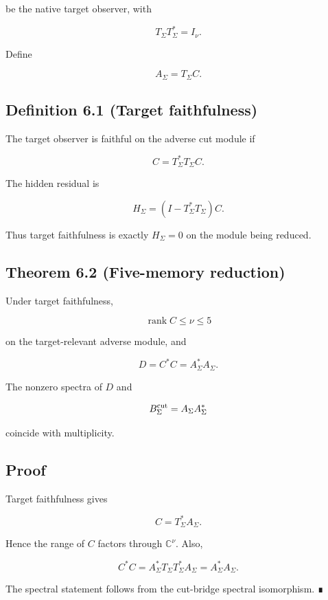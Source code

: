 be the native target observer, with

\[
T_\Sigma T_\Sigma^*=I_\nu.
\]

Define

\[
A_\Sigma=T_\Sigma C.
\]

\hypertarget{definition-6.1-target-faithfulness}{%
\subsection{Definition 6.1 (Target faithfulness)}\label{definition-6.1-target-faithfulness}}

The target observer is faithful on the adverse cut module if

\[
\boxed{C=T_\Sigma^*T_\Sigma C.}
\]

The hidden residual is

\[
H_\Sigma=(I-T_\Sigma^*T_\Sigma)C.
\]

Thus target faithfulness is exactly \(H_\Sigma=0\) on the module being
reduced.

\hypertarget{theorem-6.2-five-memory-reduction}{%
\subsection{Theorem 6.2 (Five-memory reduction)}\label{theorem-6.2-five-memory-reduction}}

Under target faithfulness,

\[
\operatorname{rank}C\le\nu\le5
\]

on the target-relevant adverse module, and

\[
\boxed{D=C^*C=A_\Sigma^*A_\Sigma.}
\]

The nonzero spectra of \(D\) and

\[
B_\Sigma^{\rm cut}=A_\Sigma A_\Sigma^*
\]

coincide with multiplicity.

\hypertarget{proof-3}{%
\subsection{Proof}\label{proof-3}}

Target faithfulness gives

\[
C=T_\Sigma^*A_\Sigma.
\]

Hence the range of \(C\) factors through \(\mathbb C^\nu\). Also,

\[
C^*C
=A_\Sigma^*T_\Sigma T_\Sigma^*A_\Sigma
=A_\Sigma^*A_\Sigma.
\]

The spectral statement follows from the cut-bridge spectral isomorphism. ∎

